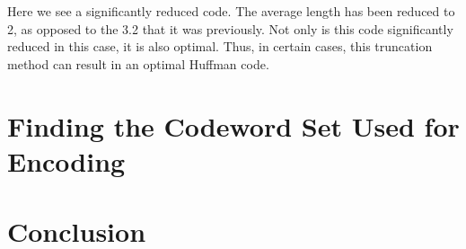 \documentclass[10pt,letterpaper,notitlepage,draft]{article}
\theoremstyle{definition}
\begin{document}
Here we see a significantly reduced code.  The average length has been reduced to 2, as opposed to the 3.2 that it was previously.  Not only is this code significantly reduced in this case, it is also optimal.  Thus, in certain cases, this truncation method can result in an optimal Huffman code.
\section{Finding the Codeword Set Used for Encoding}

\section{Conclusion}

%
%
\end{document}
